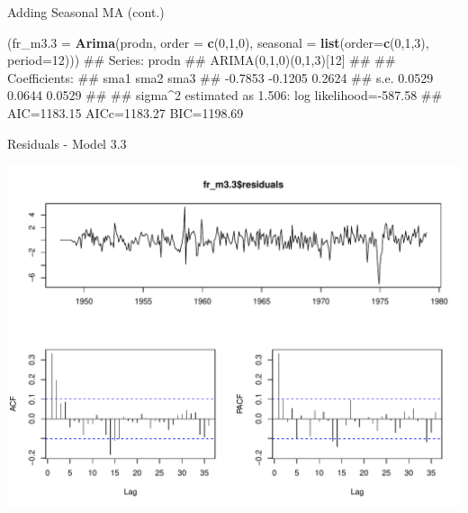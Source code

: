 \documentclass[11pt,ignorenonframetext,]{beamer}
\newenvironment{Shaded}{}{}
\newcommand{\KeywordTok}[1]{\textcolor[rgb]{0.00,0.44,0.13}{\textbf{#1}}}
\newcommand{\DataTypeTok}[1]{\textcolor[rgb]{0.56,0.13,0.00}{#1}}
\newcommand{\DecValTok}[1]{\textcolor[rgb]{0.25,0.63,0.44}{#1}}
\newcommand{\NormalTok}[1]{#1}
\let\oldShaded\Shaded
\let\endoldShaded\endShaded
\renewenvironment{Shaded}{\footnotesize\begin{spacing}{0.9}\oldShaded}{\endoldShaded\end{spacing}}
\let\oldverbatim\verbatim
\let\endoldverbatim\endverbatim
\newcommand{\scriptoutput}{
  \renewenvironment{Shaded}{\scriptsize\begin{spacing}{0.9}\oldShaded}{\endoldShaded\end{spacing}}
  \renewenvironment{verbatim}{\scriptsize\begin{spacing}{0.9}\oldverbatim}{\endoldverbatim\end{spacing}}
}
\begin{document}
\begin{frame}[fragile,t]{Adding Seasonal MA (cont.)}

\scriptoutput 

\begin{Shaded}
\begin{Highlighting}[]
\NormalTok{(}\DataTypeTok{fr_m3.3 =} \KeywordTok{Arima}\NormalTok{(prodn, }\DataTypeTok{order =} \KeywordTok{c}\NormalTok{(}\DecValTok{0}\NormalTok{,}\DecValTok{1}\NormalTok{,}\DecValTok{0}\NormalTok{), }
            \DataTypeTok{seasonal =} \KeywordTok{list}\NormalTok{(}\DataTypeTok{order=}\KeywordTok{c}\NormalTok{(}\DecValTok{0}\NormalTok{,}\DecValTok{1}\NormalTok{,}\DecValTok{3}\NormalTok{), }\DataTypeTok{period=}\DecValTok{12}\NormalTok{)))}
\NormalTok{## Series: prodn }
\NormalTok{## ARIMA(0,1,0)(0,1,3)[12]                    }
\NormalTok{## }
\NormalTok{## Coefficients:}
\NormalTok{##          sma1     sma2    sma3}
\NormalTok{##       -0.7853  -0.1205  0.2624}
\NormalTok{## s.e.   0.0529   0.0644  0.0529}
\NormalTok{## }
\NormalTok{## sigma^2 estimated as 1.506:  log likelihood=-587.58}
\NormalTok{## AIC=1183.15   AICc=1183.27   BIC=1198.69}
\end{Highlighting}
\end{Shaded}

\end{frame}

\begin{frame}{Residuals - Model 3.3}

\includegraphics{Lec11_files/figure-beamer/unnamed-chunk-20-1.pdf}

\end{frame}
\end{document}
